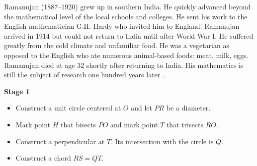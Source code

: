 Ramanujan (1887--1920) grew up in southern India. He quickly advanced beyond the mathematical level of the local schools and colleges. He sent his work to the English mathematician G.H. Hardy who invited him to England. Ramanujan arrived in 1914 but could not return to India until after World War I. He suffered greatly from the cold climate and unfamiliar food. He was a vegetarian as opposed to the English who ate numerous animal-based foods: meat, milk, eggs. Ramanujan died at age $32$ shortly after returning to India. His mathematics is still the subject of research one hundred years later \cite{kanigel}.

\newpage


\begin{center}
\textbf{\Large Stage 1}
\end{center}

\begin{itemize}
\item Construct a unit circle centered at $O$ and let $PR$ be a diameter.
\item Mark point $H$ that bisects $PO$ and mark point $T$ that trisects $RO$.
\item Construct a perpendicular at $T$. Its intersection with the circle is $Q$.
\item Construct a chord $RS=QT$.
\end{itemize}

\begin{center}
\end{center}

